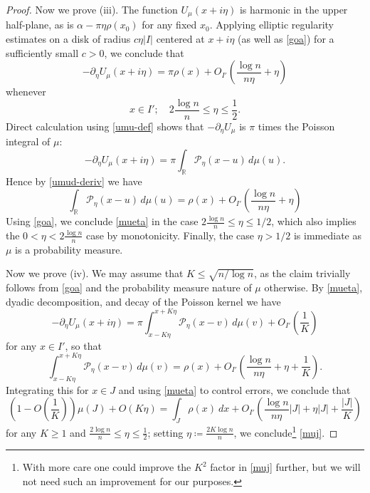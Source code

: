 \documentclass[12pt]{amsart}
\newcommand{\R}{\mathbb{R}}
\newcommand{\Poisson}{\mathcal{P}}
\begin{document}
\begin{proof}
Now we prove (iii).  The function $U_\mu(x+i\eta)$ is harmonic in the upper half-plane, as is $\alpha - \pi \eta \rho(x_0)$ for any fixed $x_0$.  Applying elliptic regularity estimates on a disk of radius $c \eta |I|$ centered at $x+i\eta$ (as well as \eqref{goa}) for a sufficiently small $c>0$, we conclude that
\begin{equation}\label{umud-deriv}
    -\partial_\eta U_\mu(x+i\eta) = \pi \rho(x) + O_{I'}\left( \frac{\log n}{n \eta} + \eta \right)
\end{equation}
whenever
\begin{equation}\label{umud-deriv-region}
    x \in I'; \quad 2 \frac{\log n}{n} \leq \eta \leq \frac{1}{2}.
\end{equation}
Direct calculation using \eqref{umu-def} shows that $-\partial_\eta U_\mu$ is $\pi$ times the Poisson integral of $\mu$:
$$ -\partial_\eta U_\mu(x+i\eta) = \pi \int_\R \Poisson_\eta(x-u)\, d\mu(u).$$
Hence by \eqref{umud-deriv} we have
\begin{equation}\label{poisson-mu}
 \int_\R \Poisson_\eta(x-u)\, d\mu(u) = \rho(x) + O_{I'}\left( \frac{\log n}{n \eta} + \eta \right)
\end{equation}
Using \eqref{goa}, we conclude \eqref{mueta} in the case $2 \frac{\log n}{n} \leq \eta \leq 1/2$, which also implies the $0 < \eta < 2 \frac{\log n}{n}$ case by monotonicity. Finally, the case $\eta > 1/2$ is immediate as $\mu$ is a probability measure.

Now we prove (iv).  We may assume that $K \leq \sqrt{n/\log n}$, as the claim trivially follows from \eqref{goa} and the probability measure nature of $\mu$ otherwise. By \eqref{mueta}, dyadic decomposition, and decay of the Poisson kernel we have
$$ -\partial_\eta U_\mu(x + i\eta) = \pi \int_{x-K\eta}^{x+K\eta} \Poisson_\eta(x-v)\,d\mu(v) + O_{I'}\left(\frac{1}{K} \right)$$
for any $x \in I'$, so that
$$ \int_{x-K\eta}^{x+K\eta} \Poisson_\eta(x-v)\,d\mu(v) = \rho(x) + O_{I'}\left( \frac{\log n}{n \eta} + \eta + \frac{1}{K} \right).$$
Integrating this for $x \in J$ and using \eqref{mueta} to control errors, we conclude that
$$ \left( 1 - O\left(\frac{1}{K}\right)\right) \mu(J) + O(K\eta)  = \int_J \rho(x)\ dx + O_{I'}\left( \frac{\log n}{n \eta} |J| + \eta |J| + \frac{|J|}{K} \right)$$
for any $K \geq 1$ and $\frac{2 \log n}{n} \leq \eta \leq \frac{1}{2}$; setting $\eta \coloneqq \frac{2 K \log n}{n}$, we conclude\footnote{With more care one could improve the $K^2$ factor in \eqref{muj} further, but we will not need such an improvement for our purposes.} \eqref{muj}.
\end{proof}
\end{document}
